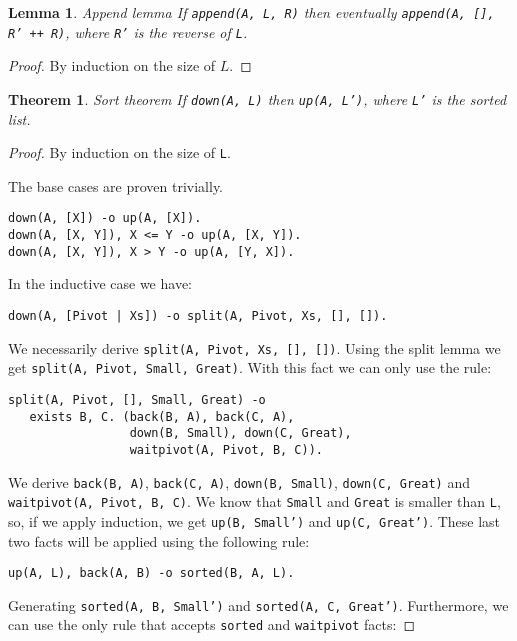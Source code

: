 \documentclass[9pt]{article}
\newtheorem{theorem}{Theorem}
\newtheorem{lemma}{Lemma}
\begin{document}
\begin{lemma}{Append lemma}
If \texttt{append(A, L, R)} then eventually \texttt{append(A, [], R' ++ R)}, where \texttt{R'} is the reverse of \texttt{L}.
\end{lemma}
\begin{proof}
By induction on the size of $L$.
\end{proof}

\begin{theorem}{Sort theorem}
If \texttt{down(A, L)} then \texttt{up(A, L')}, where \texttt{L'} is the sorted list.
\end{theorem}
\begin{proof}
By induction on the size of \texttt{L}.

The base cases are proven trivially.

\begin{verbatim}
down(A, [X]) -o up(A, [X]).
down(A, [X, Y]), X <= Y -o up(A, [X, Y]).
down(A, [X, Y]), X > Y -o up(A, [Y, X]).
\end{verbatim}

In the inductive case we have:
\begin{verbatim}
down(A, [Pivot | Xs]) -o split(A, Pivot, Xs, [], []).
\end{verbatim}

We necessarily derive \texttt{split(A, Pivot, Xs, [], [])}. Using the split lemma we get \texttt{split(A, Pivot, Small, Great)}. With this fact we can only use the rule:

\begin{verbatim}
split(A, Pivot, [], Small, Great) -o
   exists B, C. (back(B, A), back(C, A),
                 down(B, Small), down(C, Great),
                 waitpivot(A, Pivot, B, C)).
\end{verbatim}

We derive \texttt{back(B, A)}, \texttt{back(C, A)}, \texttt{down(B, Small)}, \texttt{down(C, Great)} and \texttt{waitpivot(A, Pivot, B, C)}. We know that \texttt{Small} and \texttt{Great} is smaller than \texttt{L}, so, if we apply induction, we get \texttt{up(B, Small')} and \texttt{up(C, Great')}.
These last two facts will be applied using the following rule:

\begin{verbatim}
up(A, L), back(A, B) -o sorted(B, A, L).
\end{verbatim}

Generating \texttt{sorted(A, B, Small')} and \texttt{sorted(A, C, Great')}. Furthermore, we can use the only rule that accepts \texttt{sorted} and \texttt{waitpivot} facts:


\end{proof}
\end{document}

